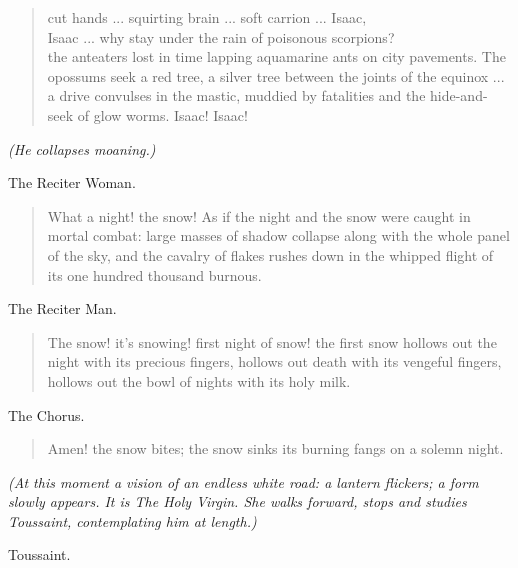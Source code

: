 \documentclass[letterpaper,article,12pt,oneside,notitlepage]{memoir}
\begin{document}
\begin{verse}
cut hands ... squirting brain ... soft carrion ... Isaac, \\
Isaac ... why stay under the rain of poisonous scorpions? \\
the anteaters lost in time lapping aquamarine ants on city pavements. The opossums seek a red tree, a silver tree between the joints of the equinox ... a drive convulses in the mastic, muddied by fatalities and the hide-and-seek of glow worms. Isaac! Isaac!   \\
\end{verse}

\textit{(He collapses moaning.)}

\begin{center}The Reciter Woman.\end{center}

\begin{verse}
What a night! the snow! As if the night and the snow were caught in mortal combat: large masses of shadow collapse along with the whole panel of the sky, and the cavalry of flakes rushes down in the whipped flight of its one hundred thousand burnous.  \\
\end{verse}

\begin{center}The Reciter Man.\end{center}

\begin{verse}
The snow! it's snowing! first night of snow! the first snow hollows out the night with its precious fingers, hollows out death with its vengeful fingers, hollows out the bowl of nights with its holy milk.  \\
\end{verse}

\begin{center}The Chorus.\end{center}

\begin{verse}
Amen! the snow bites; the snow sinks its burning fangs on a solemn night.  \\
\end{verse}

\textit{(At this moment a vision of an endless white road: a lantern flickers; a form slowly appears. It is The Holy Virgin. She walks forward, stops and studies Toussaint, contemplating him at length.)}

\begin{center}Toussaint.\end{center}
\end{document}
